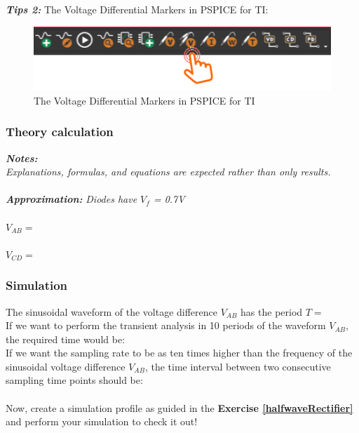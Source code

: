 \textbf{\textit{Tips 2:}}
The Voltage Differential Markers in PSPICE for TI:
\begin{figure}[H]
    \centering
    \includegraphics[width=12cm]{source/picture/bai_2/voltageDifferenceMarkers.png}
    \caption{The Voltage Differential Markers in PSPICE for TI}
    \label{vDiffMkrPair}
\end{figure}

\subsubsection{Theory calculation}
\textit{\textbf{Notes:}}\\

\textit{Explanations, formulas, and equations are expected rather than only results.}\\
\\
\textbf{\textit{Approximation:}} \textit{Diodes have $V_f$ = 0.7V}\bigskip\\
\\
$V_{AB} = $ \dotfill\bigskip\\
\\
$V_{CD} = $ \dotfill\bigskip\\


\subsubsection{Simulation}
The sinusoidal waveform of the voltage difference $V_{AB}$ has the period $T = $ \dotfill\\
If we want to perform the transient analysis in 10 periods of the waveform $V_{AB}$, the required time would be:\dotfill\\
If we want the sampling rate to be as ten times higher than the frequency of the sinusoidal voltage difference $V_{AB}$, the time interval between two consecutive sampling time points should be:\dotfill\bigskip\\
\\
Now, create a simulation profile as guided in the \textbf{Exercise \ref{halfwaveRectifier}} and perform your simulation to check it out!\\

